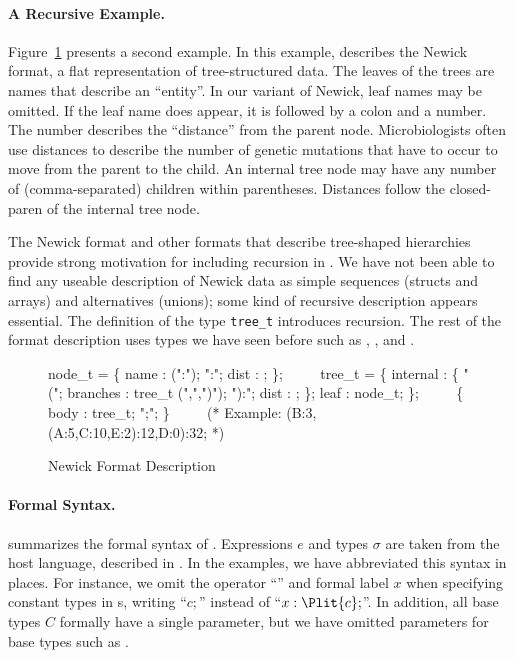 \paragraph*{A Recursive \ipads{} Example.}
Figure~\ref{fig:ipads-newick} presents a second \ipads{} example.
In this example, \ipads{} describes the Newick format, a flat
representation of tree-structured data.  The leaves of the trees
are names that describe an ``entity''.   In our variant of Newick, 
leaf names may be omitted.  If the leaf name does appear,
it is followed by a colon and a number.  The number describes the ``distance''
from the parent node.  Microbiologists often use
distances to describe the
number of genetic mutations that have to occur to move from the parent 
to the child.  An internal tree node may have any number of (comma-separated)
children within parentheses.  Distances follow the closed-paren
of the internal tree node.

The Newick format and other formats that describe tree-shaped 
hierarchies~\cite{geneontology,newick}
provide strong motivation for including recursion in \ipads.  
We have not been able to find any useable description of Newick data as
simple sequences (structs and arrays) and alternatives (unions); some
kind of recursive description appears essential.
The definition of the type {\tt tree\_t} introduces recursion.
The rest of the format description uses types we have seen before such as
\Pstruct, \Parray{}, and \Punion.


\begin{figure}
{\small
\begin{code}
node\_t = \Popt \Pstruct \{
                name : \Pstring(":"); ":";
                dist : \Puint;  
              \};
\(\qquad\)
\Prec tree\_t = \Punion \{
    internal : \Pstruct \{
        "(";  branches : tree\_t \Parray(",",")");
        "):"; dist : \Puint;
      \};
    leaf : node\_t;
  \};
\(\qquad\)
\Pstruct \{ body : tree\_t; ";"; \}
\(\qquad\)
(* Example: (B:3,(A:5,C:10,E:2):12,D:0):32; *)
\end{code}
\caption{\ipads{} Newick Format Description}
\label{fig:ipads-newick}
}
\end{figure}

\paragraph*{Formal Syntax.}
 summarizes the formal syntax of \ipads.
Expressions $e$ and types $\sigma$ are taken from the host language,  
described in . 
In the examples, we have abbreviated this syntax in places.  
For instance, we omit the operator ``'' and formal label 
$x$ when specifying constant types in \Pstruct{}s, writing
``$c;$'' instead of ``$x :
\Plit{c};$''. In addition, all
base types $C$ formally have a single parameter, but we have omitted
parameters for base types such as \Puint.  

